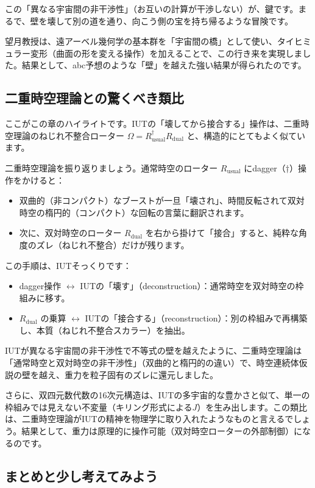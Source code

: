 \documentclass[dvipdfmx,12pt,a4paper]{jsarticle}
\begin{document}
この「異なる宇宙間の非干渉性」（お互いの計算が干渉しない）が、鍵です。まるで、壁を壊して別の道を通り、向こう側の宝を持ち帰るような冒険です。

望月教授は、遠アーベル幾何学の基本群を「宇宙間の橋」として使い、タイヒミュラー変形（曲面の形を変える操作）を加えることで、この行き来を実現しました。結果として、abc予想のような「壁」を越えた強い結果が得られたのです。

\subsection{二重時空理論との驚くべき類比}

ここがこの章のハイライトです。IUTの「壊してから接合する」操作は、二重時空理論のねじれ不整合ローター $\Omega = R_{\text{usual}}^\dagger R_{\text{dual}}$ と、構造的にとてもよく似ています。

二重時空理論を振り返りましょう。通常時空のローター $R_{\text{usual}}$ にdagger（†）操作をかけると：
\begin{itemize}
  \item 双曲的（非コンパクト）なブーストが一旦「壊され」、時間反転されて双対時空の楕円的（コンパクト）な回転の言葉に翻訳されます。
  \item 次に、双対時空のローター $R_{\text{dual}}$ を右から掛けて「接合」すると、純粋な角度のズレ（ねじれ不整合）だけが残ります。
\end{itemize}

この手順は、IUTそっくりです：
\begin{itemize}
  \item dagger操作 $\leftrightarrow$ IUTの「壊す」（deconstruction）：通常時空を双対時空の枠組みに移す。
  \item $R_{\text{dual}}$ の乗算 $\leftrightarrow$ IUTの「接合する」（reconstruction）：別の枠組みで再構築し、本質（ねじれ不整合スカラー）を抽出。
\end{itemize}

IUTが異なる宇宙間の非干渉性で不等式の壁を越えたように、二重時空理論は「通常時空と双対時空の非干渉性」（双曲的と楕円的の違い）で、時空連続体仮説の壁を越え、重力を粒子固有のズレに還元しました。

さらに、双四元数代数の16次元構造は、IUTの多宇宙的な豊かさと似て、単一の枠組みでは見えない不変量（キリング形式による$J$）を生み出します。この類比は、二重時空理論がIUTの精神を物理学に取り入れたようなものと言えるでしょう。結果として、重力は原理的に操作可能（双対時空ローターの外部制御）になるのです。

\subsection{まとめと少し考えてみよう}
\end{document}
